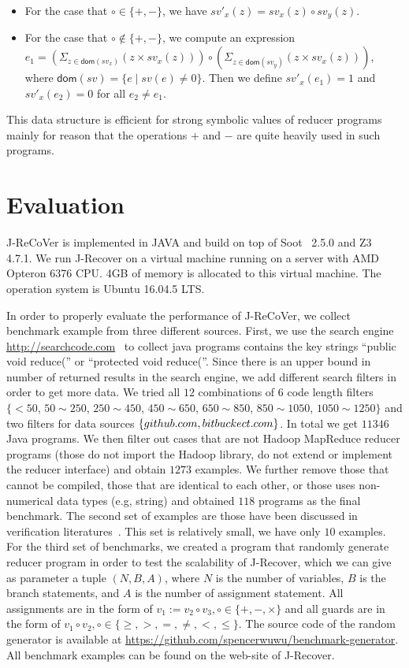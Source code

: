 \documentclass{llncs}
\newcommand{\dom}[1]{\mathsf{dom}(#1)}
\begin{document}
\begin{itemize}
	\item For the case that $\circ \in\{+,-\}$, we have $sv'_x(z) = sv_x(z)\circ  sv_y(z)$. 
	\item For the case that $\circ \notin\{+,-\}$, we compute an expression $e_1= (\Sigma_{z\in \dom{sv_x}} (z\times sv_x(z)) )\circ (\Sigma_{z\in \dom{sv_y}} (z\times sv_x(z)))$, where $\dom{sv}=\{e\mid sv(e)\neq 0\}$. Then we define $sv'_x(e_1) =1$ and $sv'_x(e_2) = 0$ for all $e_2\neq e_1$. 
\end{itemize}

This data structure is efficient for strong symbolic values of reducer programs mainly for reason that the operations $+$ and $-$ are quite heavily used in such programs. 



\section{Evaluation}
\label{section:exp}
J-ReCoVer is implemented in JAVA and build on top of Soot~\cite{soot} 2.5.0 and Z3~\cite{z3} 4.7.1. We run J-Recover on a virtual machine running on a server with AMD Opteron 6376 CPU. 4GB of memory is allocated to this virtual machine. The operation system is Ubuntu 16.04.5 LTS. 


 In order to properly evaluate the performance of J-ReCoVer, we collect benchmark example from three different sources. 
First, we use the search engine \url{http://searchcode.com}~\cite{searchcode} to collect java programs contains the key strings ``public void reduce('' or ``protected void reduce(''.  Since there is an upper bound in number of returned results in the search engine, we add different search filters in order to get more data. We tried all $12$ combinations of $6$ code length filters $\{<50$, $ 50\sim 250$, $250\sim 450$, $450\sim 650$, $650\sim 850$, $850\sim 1050$, $1050\sim 1250\}$ 
and two filters for data sources $\{github.com, bitbuckect.com\}$. In total we get $11346$ Java programs. We then filter out cases that are not Hadoop MapReduce reducer programs (those do not import the Hadoop library, do not extend or implement the reducer interface) and obtain $1273$ examples. We further remove those that cannot be compiled, those that are identical to each other, or those uses non-numerical data types (e.g, string) and obtained $118$ programs as the final benchmark.
The second set of examples are those have been discussed in verification literatures~\cite{ChenHSW15,ChenSW16,SmithA16}. This set is relatively small, we have only $10$ examples. 
For the third set of benchmarks, we created a program that randomly generate reducer program in order to test the scalability of J-Recover, which we can give as parameter a tuple $(N,B,A)$, where $N$ is the number of variables, $B$ is the branch statements, and $A$ is the number of assignment statement. All assignments are in the form of $v_1 := v_2\circ v_3,\circ\in\{+,-,\times\}$ and all guards are in the form of $v_1 \circ v_2, \circ\in\{\geq, >,=, \neq, <,\leq \}$.
 The source code of the random generator is available at \url{https://github.com/spencerwuwu/benchmark-generator}.
All benchmark examples can be found on the web-site of J-Recover.
\end{document}
